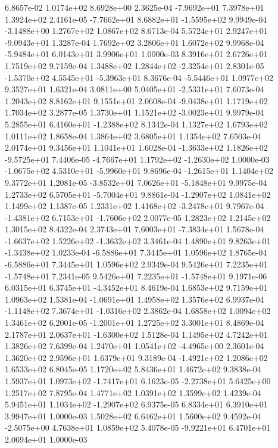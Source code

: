 6.8657e-02 1.0174e+02 8.6928e+00  2.3625e-04
-7.9692e+01  7.3978e+01  1.3924e+02  2.4161e-05
-7.7662e+01  8.6882e+01 -1.5595e+02  9.9949e-04
-3.1488e+00  1.2767e+02  1.0867e+02  8.6713e-04
 5.5724e+01  2.9247e+01 -9.0943e+01  1.3287e-04
1.7692e+02 3.2806e+01 1.6072e+02  9.9968e-04
-5.9484e+01  6.0143e+01  3.9906e+01  1.0000e-03
8.3916e+01 2.6726e+01 1.7519e+02  9.7159e-04
 1.3488e+02  1.2844e+02 -2.3254e+01  2.8301e-05
-1.5370e+02  4.5545e+01 -5.3963e+01  8.3676e-04
-5.5446e+01  1.0977e+02  9.3527e+01  1.6321e-04
 3.0811e+00  5.0405e+01 -2.5331e+01  7.6073e-04
1.2043e+02 8.8162e+01 9.1551e+01  2.0608e-04
-9.0438e+01  1.1719e+02  1.7034e+02  3.2877e-05
 1.3730e+01  1.1521e+02 -3.0023e+01  9.9979e-04
 5.2855e+01  6.4160e+01 -1.2388e+02  8.1342e-04
1.1327e+02 1.6793e+02 1.0111e+02  1.8658e-04
1.3864e+02 3.6805e+01 1.1354e+02  7.6503e-04
2.0174e+01 9.3456e+01 1.1041e+01  1.6028e-04
-1.3633e+02  1.1826e+02 -9.5725e+01  7.4406e-05
-4.7667e+01  1.1792e+02 -1.2630e+02  1.0000e-03
-1.0675e+02  4.5310e+01 -5.9960e+01  9.8696e-04
-1.2615e+01  1.1404e+02  9.3772e+01  1.2081e-05
-3.8532e+01  7.0626e+01 -5.1848e+01  9.9975e-04
 1.2733e+02  6.5705e+01 -5.7004e+01  9.8861e-04
-1.2907e+02  1.0841e+02  1.1499e+02  1.1387e-05
 1.2331e+02  1.4168e+02 -3.2478e+01  9.7967e-04
-1.4381e+02  6.7153e+01 -1.7606e+02  2.0077e-05
1.2823e+02 1.2145e+02 1.3015e+02  8.4322e-04
 2.3743e+01  7.6003e+01 -7.3834e+01  1.5678e-04
-1.6637e+02  1.5226e+02 -1.3632e+02  3.3461e-04
 1.4890e+01  9.8263e+01 -1.3438e+02  1.0233e-04
-6.5886e+01  7.3445e+01  1.0596e+02  1.8765e-04
-6.5886e+01  7.3445e+01  1.0596e+02  2.9349e-04
 9.5426e+01  7.2235e+01 -1.5748e+01  7.2341e-05
 9.5426e+01  7.2235e+01 -1.5748e+01  9.1971e-06
 6.0315e+01  6.3745e+01 -4.3452e+01  8.4619e-04
1.6853e+02 9.7159e+01 1.0963e+02  1.5381e-04
-1.0691e+01  1.4958e+02  1.3576e+02  6.9937e-04
-1.1148e+02  7.3674e+01 -1.0316e+02  2.3862e-04
1.6858e+02 1.0094e+02 1.3461e+02  6.2001e-05
-1.2001e+01  1.2725e+02  3.3001e+01  8.4869e-04
 2.1787e+01  2.0637e+01 -1.6300e+02  1.5128e-04
1.1495e+02 4.7242e+01 1.3826e+02  7.6399e-04
 1.2470e+01  1.0541e+02 -4.4965e+00  2.3601e-04
1.3620e+02 2.9596e+01 1.6379e+01  9.3189e-04
-1.4921e+02  1.2086e+02  1.6533e+02  6.8045e-05
1.1720e+02 5.8436e+01 1.4672e+02  9.3838e-04
 1.5937e+01  1.0973e+02 -1.7417e+01  6.1623e-05
-2.2738e+01  5.6425e+00  1.2517e+02  7.8795e-04
1.4771e+02 1.0391e+02 1.3599e+02  1.4239e-04
 5.9451e+01  1.1034e+02 -1.2907e+02  6.9375e-05
6.8334e+01 6.3910e+01 3.9947e+01  1.0000e-03
1.5028e+02 6.6462e+01 1.5600e+02  9.4592e-04
-2.5075e+00  4.7638e+01  1.0859e+02  5.4078e-05
-9.9221e+01  6.4701e+01  2.0694e+01  1.0000e-03
